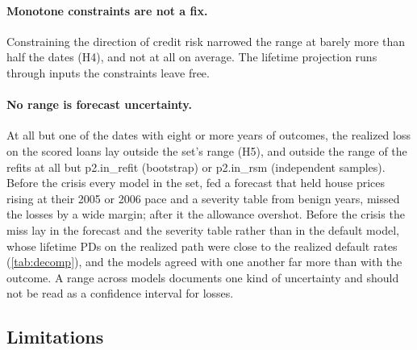 \paragraph{Monotone constraints are not a fix.} Constraining the direction of
credit risk narrowed the range at barely more than half the dates (H4), and
not at all on average. The lifetime projection runs through inputs the
constraints leave free.

\paragraph{No range is forecast uncertainty.} At all but one of the
dates with eight or more years of outcomes, the realized loss on the scored
loans lay outside the set's range (H5), and outside the range of the refits at
all but \num{p2.in_refit} (bootstrap) or \num{p2.in_rsm} (independent samples). Before the crisis every model in the
set, fed a forecast that held house prices rising at their 2005 or 2006 pace
and a severity table from benign years, missed the losses by a wide margin;
after it the allowance overshot. Before the crisis the miss lay in the
forecast and the severity table rather than in the default model, whose
lifetime PDs on the realized path were close to the realized default rates
(\cref{tab:decomp}), and the models agreed with one another far more than
with the outcome. A range across models documents one kind of uncertainty
and should not be read as a confidence interval for losses.

\subsection{Limitations}\label{sec:limits}

